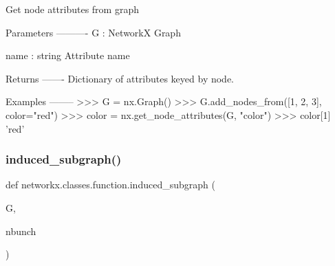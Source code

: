 \begin{DoxyVerb}Get node attributes from graph

Parameters
----------
G : NetworkX Graph

name : string
   Attribute name

Returns
-------
Dictionary of attributes keyed by node.

Examples
--------
>>> G = nx.Graph()
>>> G.add_nodes_from([1, 2, 3], color="red")
>>> color = nx.get_node_attributes(G, "color")
>>> color[1]
'red'
\end{DoxyVerb}
 \mbox{\label{namespacenetworkx_1_1classes_1_1function_a45a2ad0f85ad7d26c35b59a641025c3c}} 
\subsubsection{\texorpdfstring{induced\+\_\+subgraph()}{induced\_subgraph()}}
{\footnotesize\ttfamily def networkx.\+classes.\+function.\+induced\+\_\+subgraph (\begin{DoxyParamCaption}\item[{}]{G,  }\item[{}]{nbunch }\end{DoxyParamCaption})}

